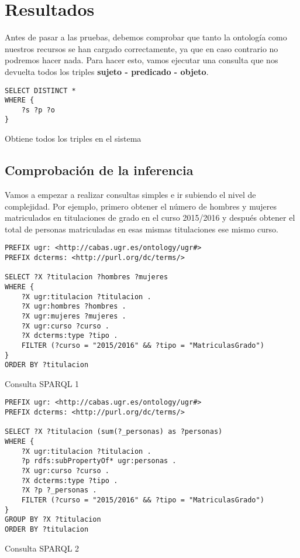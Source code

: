 \chapter{Resultados}

Antes de pasar a las pruebas, debemos comprobar que tanto la ontología como nuestros recursos se han cargado correctamente, ya que en caso contrario no podremos hacer nada. Para hacer esto, vamos ejecutar una consulta que nos devuelta todos los triples {\bf sujeto - predicado - objeto}.

\begin{listing}[!ht]
\begin{verbatim}
SELECT DISTINCT *
WHERE {
	?s ?p ?o
}
\end{verbatim}
\caption{Obtiene todos los triples en el sistema}
\end{listing}

\section{Comprobación de la inferencia}

Vamos a empezar a realizar consultas simples e ir subiendo el nivel de complejidad. Por ejemplo, primero obtener el número de hombres y mujeres matriculados en titulaciones de grado en el curso 2015/2016 y después obtener el total de personas matriculadas en esas mismas titulaciones ese mismo curso.
\bigskip

\begin{listing}[!ht]
\begin{verbatim}
PREFIX ugr: <http://cabas.ugr.es/ontology/ugr#>
PREFIX dcterms: <http://purl.org/dc/terms/>

SELECT ?X ?titulacion ?hombres ?mujeres 
WHERE {
	?X ugr:titulacion ?titulacion .
	?X ugr:hombres ?hombres .
	?X ugr:mujeres ?mujeres .
	?X ugr:curso ?curso .
	?X dcterms:type ?tipo .
	FILTER (?curso = "2015/2016" && ?tipo = "MatriculasGrado")
}
ORDER BY ?titulacion
\end{verbatim}
\caption{Consulta SPARQL 1}
\end{listing}

\begin{listing}[!ht]
	\begin{verbatim}
PREFIX ugr: <http://cabas.ugr.es/ontology/ugr#>
PREFIX dcterms: <http://purl.org/dc/terms/>

SELECT ?X ?titulacion (sum(?_personas) as ?personas) 
WHERE {
	?X ugr:titulacion ?titulacion .
	?p rdfs:subPropertyOf* ugr:personas .
	?X ugr:curso ?curso .
	?X dcterms:type ?tipo .
	?X ?p ?_personas .
	FILTER (?curso = "2015/2016" && ?tipo = "MatriculasGrado")
}
GROUP BY ?X ?titulacion
ORDER BY ?titulacion
\end{verbatim}
\caption{Consulta SPARQL 2}
\end{listing}

